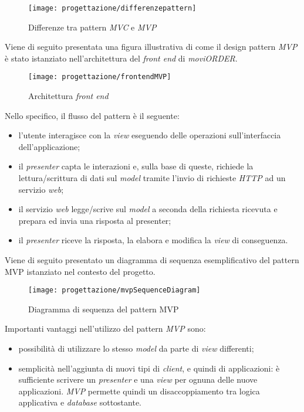 \begin{figure}[!h] 
    \centering 
    \texttt{[image: progettazione/differenzepattern]} 
    \caption{Differenze tra pattern \textit{MVC} e \textit{MVP}}
\end{figure}

Viene di seguito presentata una figura illustrativa di come il design pattern \textit{MVP} è stato istanziato nell'architettura del \textit{front end} di \textit{moviORDER}.

\begin{figure}[!h] 
    \centering 
    \texttt{[image: progettazione/frontendMVP]} 
    \caption{Architettura \textit{front end}}
\end{figure}

Nello specifico, il flusso del pattern è il seguente:
\begin{itemize}
	\item l'utente interagisce con la \textit{view} eseguendo delle operazioni sull'interfaccia dell'applicazione;
	\item il \textit{presenter} capta le interazioni e, sulla base di queste, richiede la lettura/scrittura di dati sul \textit{model} tramite l'invio di richieste \textit{HTTP} ad un servizio \textit{web};
	\item il servizio \textit{web} legge/scrive sul \textit{model} a seconda della richiesta ricevuta e prepara ed invia una risposta al presenter;
	\item il \textit{presenter} riceve la risposta, la elabora e modifica la \textit{view} di conseguenza.
\end{itemize}
Viene di seguito presentato un diagramma di sequenza esemplificativo del pattern MVP istanziato nel contesto del progetto.

\begin{figure}[!h] 
    \centering 
    \texttt{[image: progettazione/mvpSequenceDiagram]} 
    \caption{Diagramma di sequenza del pattern MVP}
\end{figure}

Importanti vantaggi nell'utilizzo del pattern \textit{MVP} sono:
\begin{itemize}
	\item possibilità di utilizzare lo stesso \textit{model} da parte di \textit{view} differenti;
	\item semplicità nell'aggiunta di nuovi tipi di \textit{client}, e quindi di applicazioni: è sufficiente scrivere un \textit{presenter} e una \textit{view} per ognuna delle nuove applicazioni. \textit{MVP} permette quindi un disaccoppiamento tra logica applicativa e \textit{database} sottostante.
\end{itemize}

